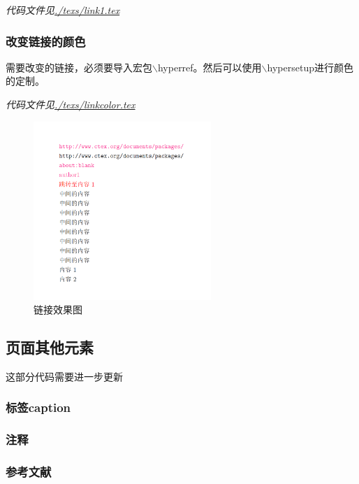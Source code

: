 \documentclass{article}
\begin{document}
                
                \textit{代码文件见\url{./texs/link1.tex}}

            \hypertarget{changelinkcolor}{}
            \subsubsection{改变链接的颜色}
                需要改变的链接，必须要导入宏包$\backslash$hyperref。然后可以使用$\backslash$hypersetup进行颜色的定制。

                
                \textit{代码文件见\url{./texs/linkcolor.tex}}

                \begin{figure}[H]
                    \centering
                    \includegraphics[width=0.6\textwidth]{snaps/snap4.png}
                    \caption{链接效果图}
                    \label{snap4}
                \end{figure}

        \subsection{页面其他元素}
            这部分代码需要进一步更新
            \subsubsection{标签caption}
            \subsubsection{注释}
            \subsubsection{参考文献}
        \hypertarget{other-question}{}
\end{document}
